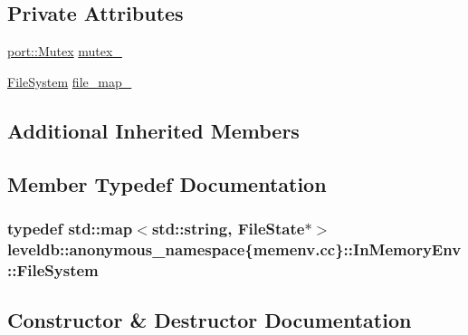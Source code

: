 \subsection*{Private Attributes}
\begin{DoxyCompactItemize}
\item 
\hyperlink{classleveldb_1_1port_1_1_mutex}{port\+::\+Mutex} \hyperlink{classleveldb_1_1anonymous__namespace_02memenv_8cc_03_1_1_in_memory_env_ae70efa79fc801940537e4f31cec193ad}{mutex\+\_\+}
\item 
\hyperlink{classleveldb_1_1anonymous__namespace_02memenv_8cc_03_1_1_in_memory_env_a30e26e3c602ae04397a4dea942584ea1}{File\+System} \hyperlink{classleveldb_1_1anonymous__namespace_02memenv_8cc_03_1_1_in_memory_env_ae59bafc551305307a2af0658290eea04}{file\+\_\+map\+\_\+}
\end{DoxyCompactItemize}
\subsection*{Additional Inherited Members}


\subsection{Member Typedef Documentation}
\hypertarget{classleveldb_1_1anonymous__namespace_02memenv_8cc_03_1_1_in_memory_env_a30e26e3c602ae04397a4dea942584ea1}{}
\subsubsection[{File\+System}]{\setlength{\rightskip}{0pt plus 5cm}typedef std\+::map$<$std\+::string, {\bf File\+State}$\ast$$>$ leveldb\+::anonymous\+\_\+namespace\{memenv.\+cc\}\+::{\bf In\+Memory\+Env\+::\+File\+System}\hspace{0.3cm}{\ttfamily [private]}}\label{classleveldb_1_1anonymous__namespace_02memenv_8cc_03_1_1_in_memory_env_a30e26e3c602ae04397a4dea942584ea1}


\subsection{Constructor \& Destructor Documentation}
\hypertarget{classleveldb_1_1anonymous__namespace_02memenv_8cc_03_1_1_in_memory_env_a16c34d3ac17319ea033d9dcee2706d35}{}
